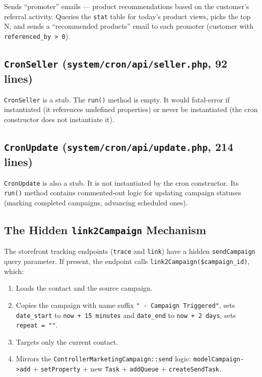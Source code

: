 \documentclass[11pt,a4paper]{article}
\begin{document}
Sends ``promoter'' emails --- product recommendations based on
the customer's referral activity. Queries the \texttt{stat} table
for today's product views, picks the top N, and sends a
``recommended products'' email to each promoter (customer with
\texttt{referenced\_by > 0}).

\subsection{\texttt{CronSeller} (\texttt{system/cron/api/seller.php}, 92 lines)}

\begin{findingbox}
\texttt{CronSeller} is a stub. The \texttt{run()} method is
empty. It would fatal-error if instantiated (it references
undefined properties) or never be instantiated (the cron
constructor does not instantiate it).
\end{findingbox}

\subsection{\texttt{CronUpdate} (\texttt{system/cron/api/update.php}, 214 lines)}

\begin{findingbox}
\texttt{CronUpdate} is also a stub. It is not instantiated by
the cron constructor. Its \texttt{run()} method contains
commented-out logic for updating campaign statuses (marking
completed campaigns, advancing scheduled ones).
\end{findingbox}

\subsection{The Hidden \texttt{link2Campaign} Mechanism}

The storefront tracking endpoints (\texttt{trace} and
\texttt{link}) have a hidden \texttt{sendCampaign} query
parameter. If present, the endpoint calls
\texttt{link2Campaign(\$campaign\_id)}, which:

\begin{enumerate}[leftmargin=1.6em,itemsep=2pt]
  \item Loads the contact and the source campaign.
  \item Copies the campaign with name suffix \texttt{" - Campaign
        Triggered"}, sets \texttt{date\_start} to
        \texttt{now + 15 minutes} and \texttt{date\_end} to
        \texttt{now + 2 days}, sets \texttt{repeat = ""}.
  \item Targets only the current contact.
  \item Mirrors the \texttt{ControllerMarketingCampaign::send}
        logic: \texttt{modelCampaign->add} + \texttt{setProperty}
        + new \texttt{Task} + \texttt{addQueue} +
        \texttt{createSendTask}.
\end{enumerate}
\end{document}
